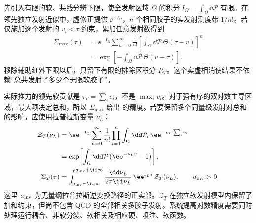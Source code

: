 \begin{derivation}
先引入有限的软、共线分辨下限，使全发射区域 $\Omega$ 的积分 $I_\Omega=\int_\Omega\dd\mathcal P$ 有限。在领先独立发射近似中，虚修正提供 $\ee^{-I_\Omega}$，$n$ 个相同胶子的实发射测度带 $1/n!$。若仅施加逐个发射的 $v_i<\tau$ 约束，累加任意发射数得到
\begin{align*}
 \Sigma_{\max}(\tau)
 &=\ee^{-I_\Omega}\sum_{n=0}^\infty\frac1{n!}
 \left[\int_\Omega\dd\mathcal P\,\Theta(\tau-v)\right]^n\\
 &=\exp\!\left[-\int_\Omega\dd\mathcal P\,\Theta(v-\tau)\right].
\end{align*}
移除辅助红外下限以后，只留下有限的排除区积分 $R_T$。这个实虚相消使结果不依赖“总共发射了多少个无限软胶子”。

实际推力的领先软贡献是 $\tau_T=\sum_i v_i$，不是 $\max_i v_i$。对于强有序的双对数主导区域，最大项决定总和，所以 $\Sigma_{\max}$ 给出 的精度。若要保留多个同量级发射对总和的影响，应使用拉普拉斯变量 $\nu_L$：
\begin{align*}
 \mathcal Z_T(\nu_L)
 &=\ee^{-I_\Omega}\sum_{n=0}^\infty\frac1{n!}
 \prod_{i=1}^n\int_\Omega\dd\mathcal P_i\,
 \ee^{-\nu_L\sum_i v_i}\\
 &=\exp\!\left[\int_\Omega\dd\mathcal P\,(\ee^{-\nu_Lv}-1)\right],\\
 \Sigma_T(\tau)
 &=\int_{a_{\rm inv}-\ii\infty}^{a_{\rm inv}+\ii\infty}
 \frac{\dd\nu_L}{2\pi\ii\nu_L}\,
 \ee^{\nu_L\tau}\mathcal Z_T(\nu_L),\qquad a_{\rm inv}>0.
\end{align*}
这里 $a_{\rm inv}$ 为无量纲拉普拉斯逆变换路径的正实部。$\mathcal Z_T$ 在独立软发射模型内保留了加和约束，但尚不包含 QCD 的全部相关多胶子发射。系统提高对数精度需要同时处理运行耦合、非软分裂、软相关及相应硬、喷注、软函数。
\end{derivation}

